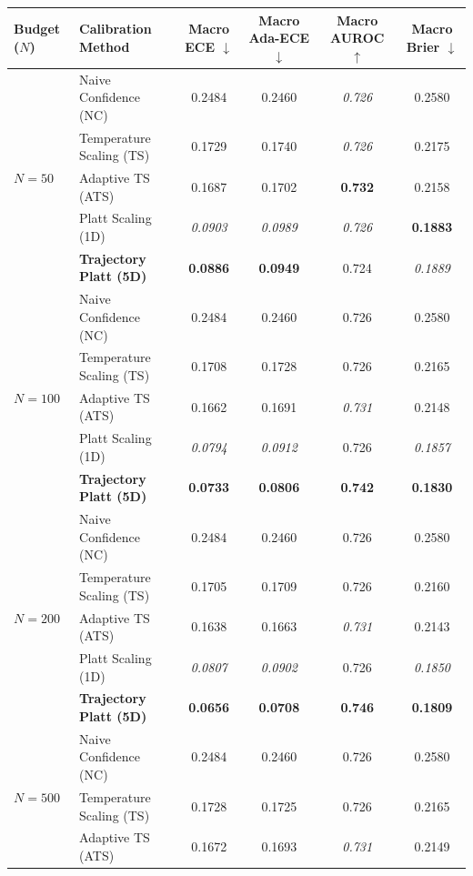 \begin{table}[t]
\setlength{\tabcolsep}{4pt}
\renewcommand{\arraystretch}{1.05}
\centering
\footnotesize
\begin{tabular}{llcccc}
\toprule
\textbf{Budget ($N$)} & \textbf{Calibration Method} & \textbf{Macro ECE} $\downarrow$ & \textbf{Macro Ada-ECE} $\downarrow$ & \textbf{Macro AUROC} $\uparrow$ & \textbf{Macro Brier} $\downarrow$ \\
\midrule
\multirow{5}{*}{$N = 50$} & Naive Confidence (NC) & 0.2484 & 0.2460 & \textit{0.726} & 0.2580 \\
 & Temperature Scaling (TS) & 0.1729 & 0.1740 & \textit{0.726} & 0.2175 \\
 & Adaptive TS (ATS) & 0.1687 & 0.1702 & \textbf{0.732} & 0.2158 \\
 & Platt Scaling (1D) & \textit{0.0903} & \textit{0.0989} & \textit{0.726} & \textbf{0.1883} \\
 & \textbf{Trajectory Platt (5D)} & \textbf{0.0886} & \textbf{0.0949} & 0.724 & \textit{0.1889} \\
\midrule
\multirow{5}{*}{$N = 100$} & Naive Confidence (NC) & 0.2484 & 0.2460 & 0.726 & 0.2580 \\
 & Temperature Scaling (TS) & 0.1708 & 0.1728 & 0.726 & 0.2165 \\
 & Adaptive TS (ATS) & 0.1662 & 0.1691 & \textit{0.731} & 0.2148 \\
 & Platt Scaling (1D) & \textit{0.0794} & \textit{0.0912} & 0.726 & \textit{0.1857} \\
 & \textbf{Trajectory Platt (5D)} & \textbf{0.0733} & \textbf{0.0806} & \textbf{0.742} & \textbf{0.1830} \\
\midrule
\multirow{5}{*}{$N = 200$} & Naive Confidence (NC) & 0.2484 & 0.2460 & 0.726 & 0.2580 \\
 & Temperature Scaling (TS) & 0.1705 & 0.1709 & 0.726 & 0.2160 \\
 & Adaptive TS (ATS) & 0.1638 & 0.1663 & \textit{0.731} & 0.2143 \\
 & Platt Scaling (1D) & \textit{0.0807} & \textit{0.0902} & 0.726 & \textit{0.1850} \\
 & \textbf{Trajectory Platt (5D)} & \textbf{0.0656} & \textbf{0.0708} & \textbf{0.746} & \textbf{0.1809} \\
\midrule
\multirow{5}{*}{$N = 500$} & Naive Confidence (NC) & 0.2484 & 0.2460 & 0.726 & 0.2580 \\
 & Temperature Scaling (TS) & 0.1728 & 0.1725 & 0.726 & 0.2165 \\
 & Adaptive TS (ATS) & 0.1672 & 0.1693 & \textit{0.731} & 0.2149 \\

\end{tabular}
\end{table}
